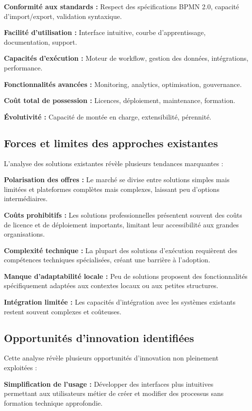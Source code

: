 \textbf{Conformité aux standards :} Respect des spécifications BPMN 2.0, capacité d'import/export, validation syntaxique.

\textbf{Facilité d'utilisation :} Interface intuitive, courbe d'apprentissage, documentation, support.

\textbf{Capacités d'exécution :} Moteur de workflow, gestion des données, intégrations, performance.

\textbf{Fonctionnalités avancées :} Monitoring, analytics, optimisation, gouvernance.

\textbf{Coût total de possession :} Licences, déploiement, maintenance, formation.

\textbf{Évolutivité :} Capacité de montée en charge, extensibilité, pérennité.

\subsection{Forces et limites des approches existantes}

L'analyse des solutions existantes révèle plusieurs tendances marquantes :

\textbf{Polarisation des offres :} Le marché se divise entre solutions simples mais limitées et plateformes complètes mais complexes, laissant peu d'options intermédiaires.

\textbf{Coûts prohibitifs :} Les solutions professionnelles présentent souvent des coûts de licence et de déploiement importants, limitant leur accessibilité aux grandes organisations.

\textbf{Complexité technique :} La plupart des solutions d'exécution requièrent des compétences techniques spécialisées, créant une barrière à l'adoption.

\textbf{Manque d'adaptabilité locale :} Peu de solutions proposent des fonctionnalités spécifiquement adaptées aux contextes locaux ou aux petites structures.

\textbf{Intégration limitée :} Les capacités d'intégration avec les systèmes existants restent souvent complexes et coûteuses.

\subsection{Opportunités d'innovation identifiées}

Cette analyse révèle plusieurs opportunités d'innovation non pleinement exploitées :

\textbf{Simplification de l'usage :} Développer des interfaces plus intuitives permettant aux utilisateurs métier de créer et modifier des processus sans formation technique approfondie.

